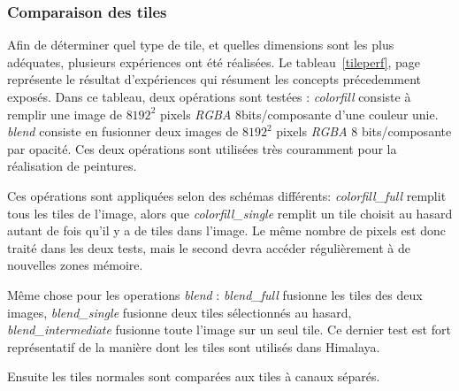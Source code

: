 		\subsubsection{Comparaison des tiles}
			Afin de déterminer quel type de tile, et quelles dimensions sont les plus adéquates, plusieurs expériences ont été réalisées.
			Le tableau~\ref{tileperf}, page~\pageref{tileperf} représente le résultat d'expériences qui résument les concepts précedemment exposés. Dans ce tableau, deux opérations
			sont testées : \emph{colorfill} consiste à remplir une image de $8192^2$ pixels \emph{RGBA} 8bits/composante d'une couleur unie. \emph{blend} consiste 
			en fusionner deux images de $8192^2$ pixels \emph{RGBA} 8 bits/composante par opacité. Ces deux opérations 
			sont utilisées très couramment pour la réalisation de peintures. 

			Ces opérations sont appliquées selon des schémas différents: \emph{colorfill\_full} remplit tous les tiles de l'image, alors que \emph{colorfill\_single}
			remplit un tile choisit au hasard autant de fois qu'il y a de tiles dans l'image. Le même nombre de pixels est donc traité dans les deux tests,
			mais le second devra accéder régulièrement à de nouvelles zones mémoire.

			Même chose pour les operations \emph{blend} : \emph{blend\_full} fusionne les tiles des deux images, \emph{blend\_single} fusionne deux tiles
			sélectionnés au hasard, \emph{blend\_intermediate} fusionne toute l'image sur un seul tile. Ce dernier test est fort représentatif de la
			manière dont les tiles sont utilisés dans Himalaya.

			Ensuite les tiles normales sont comparées aux tiles à canaux séparés. 
			

